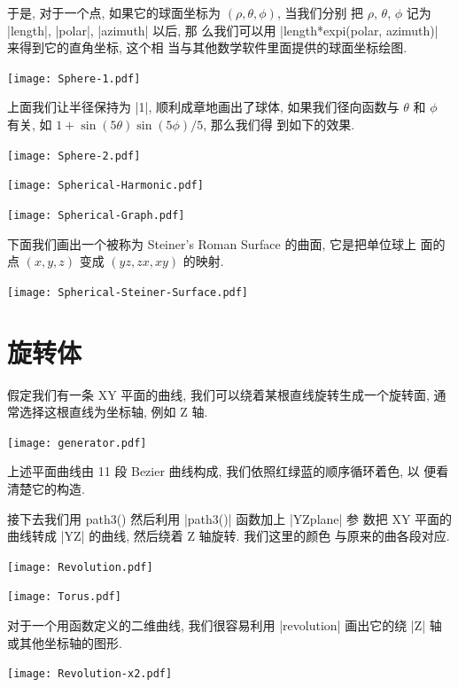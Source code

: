 \documentclass{ctexbook}
\begin{document}
于是, 对于一个点, 如果它的球面坐标为 $(\rho,\theta,\phi)$, 当我们分别
把 $\rho$, $\theta$, $\phi$ 记为 |length|, |polar|, |azimuth| 以后, 那
么我们可以用 |length*expi(polar, azimuth)| 来得到它的直角坐标, 这个相
当与其他数学软件里面提供的球面坐标绘图.

\begin{center}\texttt{[image: Sphere-1.pdf]}\end{center}%

上面我们让半径保持为 |1|, 顺利成章地画出了球体, 如果我们径向函数与
$\theta$ 和 $\phi$ 有关, 如 $1+\sin(5\theta)\sin(5\phi)/5$, 那么我们得
到如下的效果.
\begin{center}\texttt{[image: Sphere-2.pdf]}\end{center}%


\begin{center}\texttt{[image: Spherical-Harmonic.pdf]}\end{center}%


\begin{center}\texttt{[image: Spherical-Graph.pdf]}\end{center}%



下面我们画出一个被称为 Steiner's Roman Surface 的曲面, 它是把单位球上
面的点 $(x,y,z)$ 变成 $(yz,zx,xy)$ 的映射.
\begin{center}\texttt{[image: Spherical-Steiner-Surface.pdf]}\end{center}%


\section{旋转体}
假定我们有一条 XY 平面的曲线, 我们可以绕着某根直线旋转生成一个旋转面,
通常选择这根直线为坐标轴, 例如 Z 轴.
\begin{center}\texttt{[image: generator.pdf]}\end{center}%

上述平面曲线由 11 段 Bezier 曲线构成, 我们依照红绿蓝的顺序循环着色, 以
便看清楚它的构造.

接下去我们用 path3() 然后利用 |path3()| 函数加上 |YZplane| 参
数把 XY 平面的曲线转成 |YZ| 的曲线, 然后绕着 Z 轴旋转. 我们这里的颜色
与原来的曲各段对应.
\begin{center}\texttt{[image: Revolution.pdf]}\end{center}%


\begin{center}\texttt{[image: Torus.pdf]}\end{center}%

对于一个用函数定义的二维曲线, 我们很容易利用 |revolution| 画出它的绕
|Z| 轴或其他坐标轴的图形.
\begin{center}\texttt{[image: Revolution-x2.pdf]}\end{center}%

\end{document}
